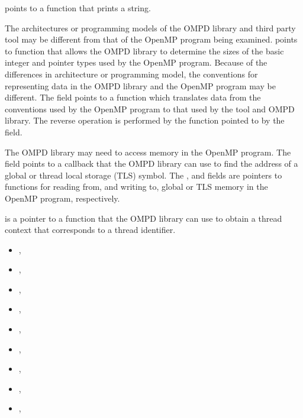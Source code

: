  points to a function that prints a string.

The architectures or programming models of the OMPD library and
third party tool may be different from that of the OpenMP
program being examined.
 points to function that allows
the OMPD library to determine the sizes of the basic integer
and pointer types used by the OpenMP program.
Because of the differences in architecture or programming model,
the conventions for representing data in the OMPD library and
the OpenMP program may be different.
The  field points to a function which translates
data from the conventions used by the OpenMP program to that used
by the tool and OMPD library.
The reverse operation is performed by the function pointed
to by the  field.

The OMPD library may need to access memory in the OpenMP program.
The  field points to a callback that the
OMPD library can use to find the address of a global or thread
local storage (TLS) symbol.
The ,  and  fields are
pointers to functions for reading from, and writing to, global or TLS
memory in the OpenMP program, respectively.

 is a pointer to a function
that the OMPD library can use to obtain a thread context that corresponds to
a thread identifier.


\crossreferences
\begin{itemize}
\item
  , 
\item
  , 
\item
  , 
\item
  , 
\item
  , 
\item
  , 
\item
  , 
\item
  , 
\item
  , 
\end{itemize}

